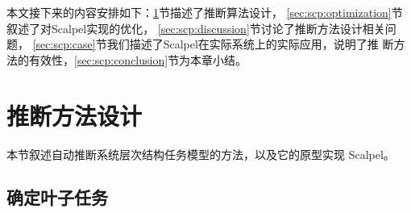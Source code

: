 本文接下来的内容安排如下：\ref{sec:scp:design}节描述了推断算法设计，
\ref{sec:scp:optimization}节叙述了对Scalpel实现的优化，
\ref{sec:scp:discussion}节讨论了推断方法设计相关问题，
\ref{sec:scp:case}节我们描述了Scalpel在实际系统上的实际应用，说明了推
断方法的有效性，\ref{sec:scp:conclusion}节为本章小结。

\section{推断方法设计}
\label{sec:scp:design}

本节叙述自动推断系统层次结构任务模型的方法，以及它的原型实现
\pozhehao{}Scalpel。



\subsection{确定叶子任务}

